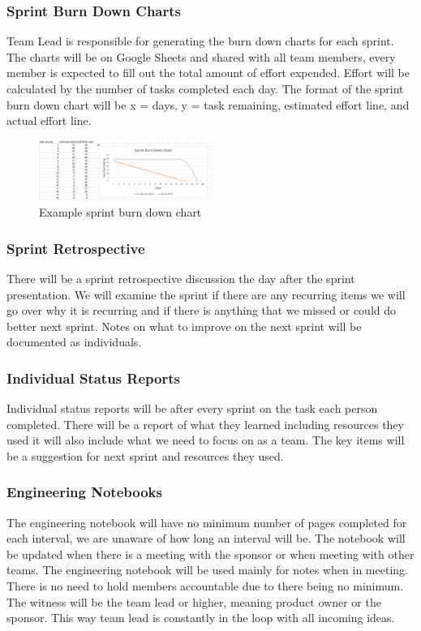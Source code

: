 \subsubsection{Sprint Burn Down Charts}
Team Lead is responsible for generating the burn down charts for each sprint. The charts will be on Google Sheets and shared with all team members, every member is expected to fill out the total amount of effort expended. Effort will be calculated by the number of tasks completed each day. The format of the sprint burn down chart will be x = days, y = task remaining, estimated effort line, and actual effort line.

\begin{figure}[h!]
    \centering
    \includegraphics[width=0.5\textwidth]{images/SprintBurn}
    \caption{Example sprint burn down chart}
\end{figure}

\subsubsection{Sprint Retrospective}
There will be a sprint retrospective discussion the day after the sprint presentation. We will examine the sprint if there are any recurring items we will go over why it is recurring and if there is anything that we missed or could do better next sprint. Notes on what to improve on the next sprint will be documented as individuals. 


\subsubsection{Individual Status Reports}
Individual status reports will be after every sprint on the task each person completed. There will be a report of what they learned including resources they used it will also include what we need to focus on as a team. The key items will be a suggestion for next sprint and resources they used.

\subsubsection{Engineering Notebooks}
The engineering notebook will have no minimum number of pages completed for each interval, we are unaware of how long an interval will be. The notebook will be updated when there is a meeting with the sponsor or when meeting with other teams. The engineering notebook will be used mainly for notes when in meeting. There is no need to hold members accountable due to there being no minimum. The witness will be the team lead or higher, meaning product owner or the sponsor. This way team lead is constantly in the loop with all incoming ideas. 

